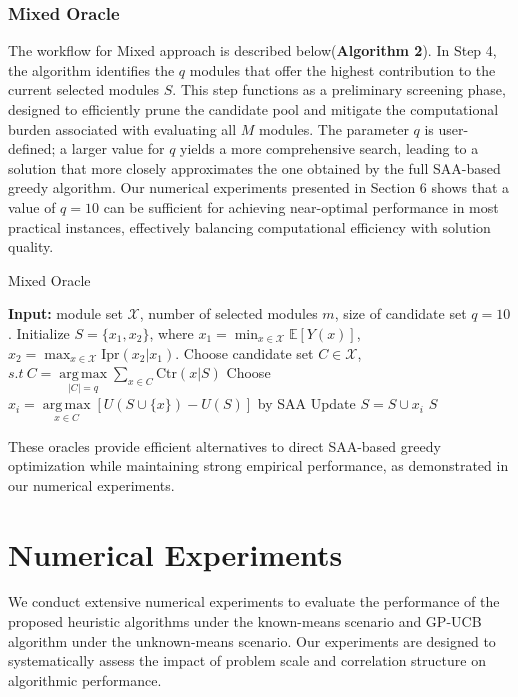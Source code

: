 \documentclass[opre,sglanonrev]{informs4}
\begin{document}
\subsubsection{Mixed Oracle}
The workflow for Mixed approach is described below(\textbf{Algorithm 2}). In Step 4, the algorithm identifies the $q$ modules that offer the highest contribution to the current selected modules $S$. This step functions as a preliminary screening phase, designed to efficiently prune the candidate pool and mitigate the computational burden associated with evaluating all $M$ modules. The parameter $q$ is user-defined; a larger value for $q$ yields a more comprehensive search, leading to a solution that more closely approximates the one obtained by the full SAA-based greedy algorithm. Our numerical experiments presented in Section 6 shows that a value of $q=10$ can be sufficient for achieving near-optimal performance in most practical instances, effectively balancing computational efficiency with solution quality.

\begin{algorithm}
\caption{Mixed Oracle} %
\label{alg:mixed} %
\begin{algorithmic}[1] %
\State \textbf{Input:} module set $\mathcal{X}$, number of selected modules $m$, size of candidate set $q=10$.
\State Initialize $S = \{x_1,x_2\}$, where $x_1 = \min_{x\in \mathcal{X}} \mathbb{E}[Y(x)]$, $x_2 = \max_{x\in \mathcal{X}} \text{Ipr}(x_2|x_1)$.
    \State Choose candidate set $C\in \mathcal{X}$, $s.t~C = \mathop{\mathrm{arg\,max}}\limits_{|C|=q} \sum_{x \in C} \text{Ctr}(x|S)$
	\State Choose $x_{i} = \mathop{\mathrm{arg\,max}}\limits_{x\in C} \left[ U(S \cup \{x\}) - U(S) \right]$ by SAA
    \State Update $S = S \cup x_i$
\EndFor
\State \Return $S$
\end{algorithmic}
\end{algorithm}

These oracles provide efficient alternatives to direct SAA-based greedy optimization while maintaining strong empirical performance, as demonstrated in our numerical experiments.


\section{Numerical Experiments}
\label{sec:experiments}

We conduct extensive numerical experiments to evaluate the performance of the proposed heuristic algorithms under the known-means scenario and GP-UCB algorithm under the unknown-means scenario. Our experiments are designed to systematically assess the impact of problem scale and correlation structure on algorithmic performance.
\end{document}
